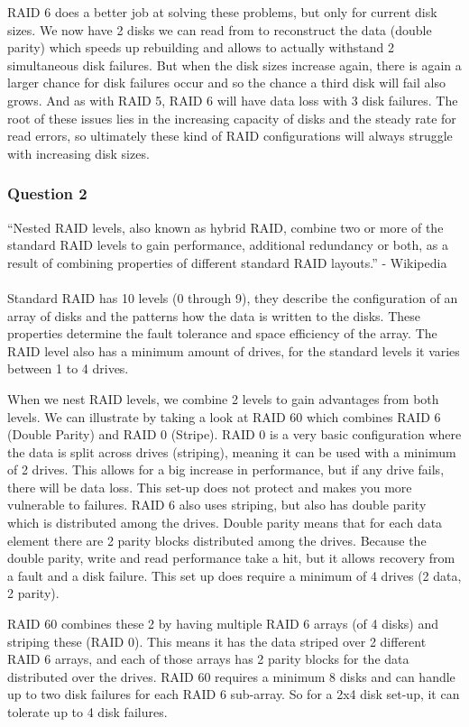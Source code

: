 \documentclass[12pt,a4paper,oneside]{article}
\begin{document}
RAID 6 does a better job at solving these problems, but only for current disk sizes. We now have 2 disks we can read from to reconstruct the data (double parity) which speeds up rebuilding and allows to actually withstand 2 simultaneous disk failures. But when the disk sizes increase again, there is again a larger chance for disk failures occur and so the chance a third disk will fail also grows. And as with RAID 5, RAID 6 will have data loss with 3 disk failures. The root of these issues lies in the increasing capacity of disks and the steady rate for read errors, so ultimately these kind of RAID configurations will always struggle with increasing disk sizes.

\subsubsection*{Question 2}
``Nested RAID levels, also known as hybrid RAID, combine two or more of the standard RAID levels to gain performance, additional redundancy or both, as a result of combining properties of different standard RAID layouts.'' - Wikipedia
\\\\
Standard RAID has 10 levels (0 through 9), they describe the configuration of an array of disks and the patterns how the data is written to the disks. These properties determine the fault tolerance and space efficiency of the array. The RAID level also has a minimum amount of drives, for the standard levels it varies between 1 to 4 drives.

When we nest RAID levels, we combine 2 levels to gain advantages from both levels.
We can illustrate by taking a look at RAID 60 which combines RAID 6 (Double Parity) and RAID 0 (Stripe). RAID 0 is a very basic configuration where the data is split across drives (striping), meaning it can be used with a minimum of 2 drives. This allows for a big increase in performance, but if any drive fails, there will be data loss. This set-up does not protect and makes you more vulnerable to failures.
RAID 6 also uses striping, but also has double parity which is distributed among the drives. Double parity means that for each data element there are 2 parity blocks distributed among the drives. Because the double parity, write and read performance take a hit, but it allows recovery from a fault and a disk failure. This set up does require a minimum of 4 drives (2 data, 2 parity).

RAID 60 combines these 2 by having multiple RAID 6 arrays (of 4 disks) and striping these (RAID 0). This means it has the data striped over 2 different RAID 6 arrays, and each of those arrays has 2 parity blocks for the data distributed over the drives. RAID 60 requires a minimum 8 disks and can handle up to two disk failures for each RAID 6 sub-array. So for a 2x4 disk set-up, it can tolerate up to 4 disk failures.
\end{document}
